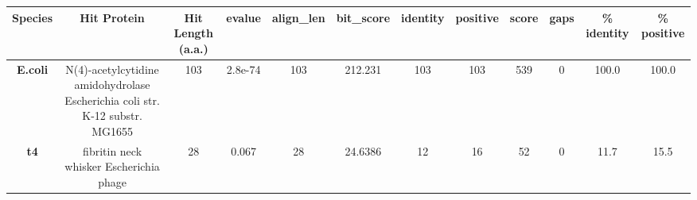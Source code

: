 \begin{tabular}{|c|c|c|c|c|c|c|c|c|c|c|c|} \hline
\textbf{Species} & \textbf{Hit Protein} & \textbf{Hit Length (a.a.)} & \textbf{evalue} & \textbf{align\_len} & \textbf{bit\_score} & \textbf{identity} & \textbf{positive} & \textbf{score} & \textbf{gaps} & \textbf{\% identity} & \textbf{\% positive} \\ \hline
\textbf{E.coli} & N(4)-acetylcytidine amidohydrolase Escherichia coli str. K-12 substr. MG1655 & 103 & 2.8e-74 & 103 & 212.231 & 103 & 103 & 539 & 0 & 100.0 & 100.0\\
\textbf{t4} & fibritin neck whisker Escherichia phage  & 28 & 0.067 & 28 & 24.6386 & 12 & 16 & 52 & 0 & 11.7 & 15.5\\
\hline \end{tabular}
